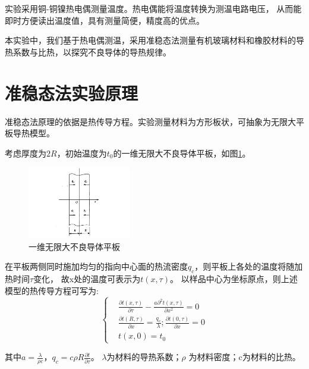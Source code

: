 \documentclass[10pt,a4paper,twocolumn,twoside,UTF8]{ctexart}
\begin{document}
实验采用铜-铜镍热电偶测量温度。热电偶能将温度转换为测温电路电压，
从而能即时方便读出温度值，具有测量简便，精度高的优点。

本实验中，我们基于热电偶测温，采用准稳态法测量有机玻璃材料和橡胶材料的导热系数与比热，以探究不良导体的导热规律。
\newpage %


\section{准稳态法实验原理\autocite{shenJiChuWuLiShiYan2015}}

    
准稳态法原理的依据是热传导方程。实验测量材料为方形板状，可抽象为无限大平板导热模型。

考虑厚度为$2R$，初始温度为$t_0$的一维无限大不良导体平板，如图\ref{fig:illus-1}。
\begin{figure}[htbp]
	\centering
	\includegraphics[width=0.4\textwidth]{attachments/illus-1.png}
	\caption{一维无限大不良导体平板}
	\label{fig:illus-1}
\end{figure}

在平板两侧同时施加均匀的指向中心面的热流密度$q_c$，则平板上各处的温度将随加热时间$\tau$变化，
故x处的温度可表示为$t ( x , \tau )$。
以样品中心为坐标原点，则上述模型的热传导方程可写为: 
\begin{equation}
	\left\{
	\begin{aligned}
	&\frac{\partial t ( x , \tau )}{\partial \tau} - \frac{a \partial ^2 t ( x , \tau )}{\partial x^2} = 0\\
	&\frac{\partial t ( R , \tau )}{\partial x}=\frac{q_c}{\lambda}; \frac{\partial t ( 0 , \tau )}{\partial x} = 0\\
	&t(x,0)=t_0
	\end{aligned}
	\right.
	\label{eq:1.1}
\end{equation}

其中$a=\frac{\lambda}{\rho c}$，$q_c=c \rho R\frac{\partial t}{\partial \tau}$。
$\lambda$为材料的导热系数；$\rho$ 为材料密度；c为材料的比热。
\end{document}
